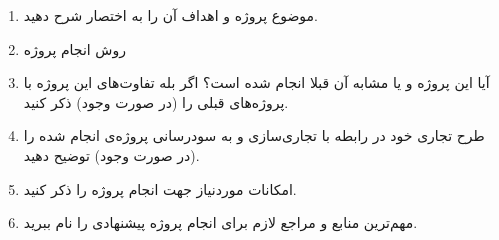 \documentclass[dvipsnames, svgnames, x11names]{article}
\begin{document}
\newpage
\begin{enumerate}
\item 
موضوع پروژه و اهداف آن را به اختصار شرح دهید.


\item 
روش انجام پروژه


\item 
آیا این پروژه و یا مشابه آن قبلا انجام شده است؟ اگر بله تفاوت‌های این پروژه با پروژه‌های قبلی را (در صورت وجود) ذکر کنید.


\item 
طرح تجاری خود در رابطه با تجاری‌سازی و به سودرسانی پروژه‌ی انجام شده را (در صورت وجود) توضیح دهید.


\item 
امکانات موردنیاز جهت انجام پروژه را ذکر کنید.


\item 
مهم‌ترین منابع و مراجع لازم برای انجام پروژه پیشنهادی را نام ببرید.



\end{enumerate}

%
%

\end{document}
